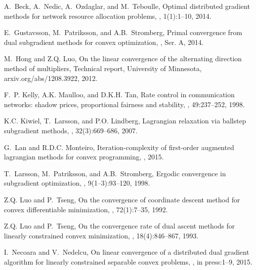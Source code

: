\documentclass{gOMS2e}
\theoremstyle{plain}
\theoremstyle{definition}
\theoremstyle{remark}
\begin{document}
\begin{thebibliography}{99}
A.~Beck, A.~Nedic, A.~Ozdaglar, and M.~Teboulle,
\newblock Optimal distributed gradient methods for network resource allocation problems,
, 1(1):1--10, 2014.

E.~Gustavsson, M.~Patriksson, and A.B.~Stromberg,
\newblock Primal convergence from dual subgradient methods for convex optimization,
, Ser. A, 2014.

M.~Hong and Z.Q. Luo,
\newblock On the linear convergence of the alternating direction method of
  multipliers,
\newblock Technical report, University of Minnesota, arxiv.org/abs/1208.3922,
  2012.

F.~P. Kelly, A.K. Maulloo, and D.K.H. Tan,
\newblock Rate control in communication networks: shadow prices, proportional
  fairness and stability,
, 49:237--252, 1998.

K.C. Kiwiel, T.~Larsson, and P.O. Lindberg,
\newblock Lagrangian relaxation via ballstep subgradient methods,
, 32(3):669--686, 2007.

G.~Lan and R.D.C. Monteiro,
\newblock Iteration-complexity of first-order augmented lagrangian methods for convex programming,
, 2015.

T.~Larsson, M.~Patriksson, and A.B.~Stromberg,
\newblock Ergodic convergence in subgradient optimization,
, 9(1--3):93--120, 1998.

Z.Q. Luo and P.~Tseng,
\newblock On the convergence of coordinate descent method for   convex
differentiable minimization,
, 72(1):7--35, 1992.

Z.Q. Luo and P.~Tseng,
\newblock On the convergence rate of dual ascent methods for
linearly constrained convex minimization,
, 18(4):846--867, 1993.

I.~Necoara and V.~Nedelcu,
\newblock On linear convergence of a distributed dual gradient algorithm for
  linearly constrained separable convex problems,
, in press:1--9, 2015.


\end{thebibliography}
\end{document}
